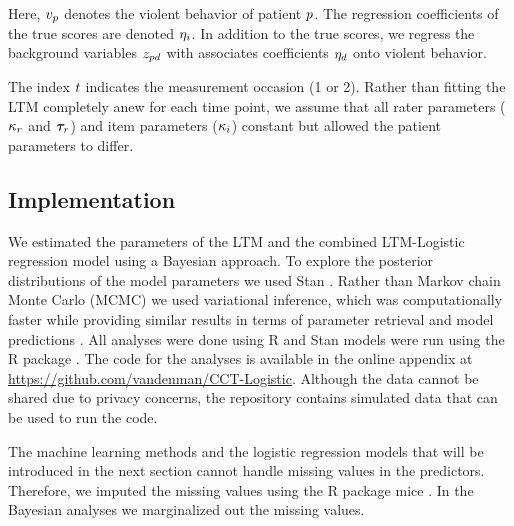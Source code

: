 \documentclass[a4paper,11pt]{article}
\newcommand{\githuburl}{\url{https://github.com/vandenman/CCT-Logistic}}
\begin{document}
Here, $v_{p}$ denotes the violent behavior of patient $p$.
The regression coefficients of the true scores are denoted $\eta_{i}$.
In addition to the true scores, we regress the background variables $z_{pd}$ with associates coefficients $\eta_{d}$ onto violent behavior.

The index $t$ indicates the measurement occasion (1 or 2).
Rather than fitting the LTM completely anew for each time point, we assume that all rater parameters ($\kappa_r$ and $\bm{\tau}_{r}$) and item parameters ($\kappa_i$) constant but allowed the patient parameters to differ.

\subsection{Implementation}
We estimated the parameters of the LTM and the combined LTM-Logistic regression model using a Bayesian approach.
To explore the posterior distributions of the model parameters we used Stan \parencite{CarpenterEtAl2017Stan}.
Rather than Markov chain Monte Carlo (MCMC) we used variational inference, which was computationally faster while providing similar results in terms of parameter retrieval and model predictions \parencite{kucukelbir2017automatic}.
All analyses were done using R \parencite{R} and Stan models were run using the R package  \parencite{cmdstanr}.
The code for the analyses is available in the online appendix at \githuburl{}.
Although the data cannot be shared due to privacy concerns, the repository contains simulated data that can be used to run the code.

The machine learning methods and the logistic regression models that will be introduced in the next section cannot handle missing values in the predictors.
Therefore, we imputed the missing values using the R package mice \parencite{miceRpackage}.
In the Bayesian analyses we marginalized out the missing values.



\end{document}
